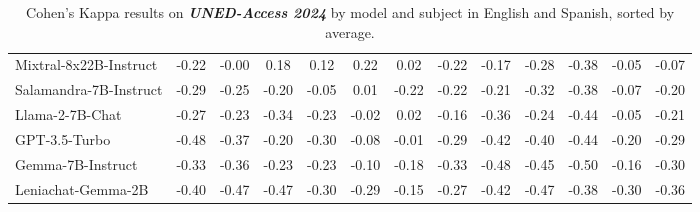 \begin{table*}[ht]
{\begin{tabular}{lcccccccccccc}
Mixtral-8x22B-Instruct & -0.22 & -0.00 & 0.18 & 0.12 & 0.22 & 0.02 & -0.22 & -0.17 & -0.28 & -0.38 & -0.05 & -0.07 \\
Salamandra-7B-Instruct & -0.29 & -0.25 & -0.20 & -0.05 & 0.01 & -0.22 & -0.22 & -0.21 & -0.32 & -0.38 & -0.07 & -0.20 \\
Llama-2-7B-Chat & -0.27 & -0.23 & -0.34 & -0.23 & -0.02 & 0.02 & -0.16 & -0.36 & -0.24 & -0.44 & -0.05 & -0.21 \\
GPT-3.5-Turbo & -0.48 & -0.37 & -0.20 & -0.30 & -0.08 & -0.01 & -0.29 & -0.42 & -0.40 & -0.44 & -0.20 & -0.29 \\
Gemma-7B-Instruct & -0.33 & -0.36 & -0.23 & -0.23 & -0.10 & -0.18 & -0.33 & -0.48 & -0.45 & -0.50 & -0.16 & -0.30 \\
Leniachat-Gemma-2B & -0.40 & -0.47 & -0.47 & -0.30 & -0.29 & -0.15 & -0.27 & -0.42 & -0.47 & -0.38 & -0.30 & -0.36 \\

\bottomrule
\end{tabular}
}

\caption{Cohen's Kappa results on \textbf{\textit{UNED-Access 2024}} by model and subject in English and Spanish, sorted by average.}
\label{tablauned}
\end{table*}





